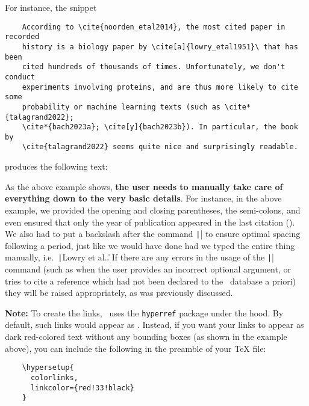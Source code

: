 \documentclass[letter, 12pt]{article}
\begin{document}
  For instance, the snippet
  \begin{verbatim}
    According to \cite{noorden_etal2014}, the most cited paper in recorded
    history is a biology paper by \cite[a]{lowry_etal1951}\ that has been 
    cited hundreds of thousands of times. Unfortunately, we don't conduct
    experiments involving proteins, and are thus more likely to cite some
    probability or machine learning texts (such as \cite*{talagrand2022};
    \cite*{bach2023a}; \cite[y]{bach2023b}). In particular, the book by
    \cite{talagrand2022} seems quite nice and surprisingly readable.
  \end{verbatim}
  produces the following text:

  \begin{center}
  \end{center}
  
  As the above example shows, \textbf{the user needs to manually take care of everything down to the very basic details}. For instance, in the above example, we provided the opening and closing parentheses, the semi-colons, and even ensured that only the year of publication appeared in the last citation (\cite*{bach2023b}). We also had to put a backslash after the command \texttt|\cite[a]{lowry_etal1951}| to ensure optimal spacing following a period, just like we would have done had we typed the entire thing manually, i.e.\ \texttt|Lowry et al.\|. If there are any errors in the usage of the \texttt|\cite{}| command (such as when the user provides an incorrect optional argument, or tries to cite a reference which had not been declared to the \dumbib\ database a priori) they will be raised appropriately, as was previously discussed.

  \noindent \textbf{Note:}  To create the links, \dumbib\ uses the \texttt{hyperref} package under the hood. By default, such links would appear as . Instead, if you want your links to appear as dark red-colored text without any bounding boxes (as shown in the example above), you can include the following in the preamble of your \TeX{} file:
  \begin{verbatim}
    \hypersetup{
      colorlinks,
      linkcolor={red!33!black}
    }
  \end{verbatim}
  
\end{document}
